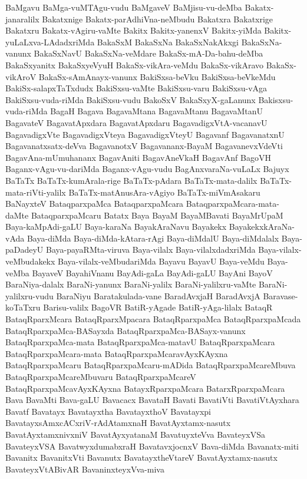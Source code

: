 {BaMgavu
BaMga-vuMTAgu-vudu
BaMgaveV
BaMjisu-vu-deMba
Bakatx-janaralilx
Bakatxnige
Bakatx-parAdhiVna-neMbudu
Bakatxra
Bakatxrige
Bakatxru
Bakatx-vAgiru-vaMte
Bakitx
Bakitx-yanenxV
Bakitx-yiMda
Bakitx-yuLaLxva-LAdadxriMda
BakaSxM
BakaSxNa
BakaSxNakAkxgi
BakaSxNa-vanunx
BakaSxNavU
BakaSxNa-veMdare
BakaSx-mA-Da-bahu-deMba
BakaSxyanitx
BakaSxyeVyuH
BakaSx-vikAra-veMdu
BakaSx-vikAravo
BakaSx-vikAroV
BakaSx-sAmAnayx-vanunx
BakiSxsa-beVku
BakiSxsa-beVkeMdu
BakiSx-salapxTaTxdudx
BakiSxsu-vaMte
BakiSxsu-varu
BakiSxsu-vAga
BakiSxsu-vuda-riMda
BakiSxsu-vudu
BakoSxV
BakaSxyX-gaLanunx
Bakisxsu-vuda-riMda
BagaH
Bagava
BagavaMtana
BagavaMtanu
BagavaMtanU
BagavateV
BagavatApxdara
BagavatApxdaru
BagavadigxVtA-vacanavU
BagavadigxVte
BagavadigxVteya
BagavadigxVteyU
Bagavanf
BagavanatxnU
Bagavanatxsatx-deVva
BagavanotxV
Bagavananx-BayaM
BagavanevxVdeVti
BagavAna-mUmuhananx
BagavAniti
BagavAneVkaH
BagavAnf
BagoVH
Baganx-vAgu-vu-dariMda
Baganx-vAgu-vudu
BagAnxvaraNa-vuLaLx
Bajuyx
BaTaTx
BaTaTx-kumArala-rige
BaTaTx-pAdara
BaTaTx-mata-dalilx
BaTaTx-mata-riVti-yalilx
BaTaTx-matAnusAra-vAgiyo
BaTaTx-miVmAsakaru
BaNayxteV
BataqparxpaMca
BataqparxpaMcara
BataqparxpaMcara-mata-daMte
BataqparxpaMcaru
Batatx
Baya
BayaM
BayaMBavati
BayaMrUpaM
Baya-kaMpAdi-gaLU
Baya-karaNa
BayakAraNavu
Bayakekx
BayakekxkAraNa-vAda
Baya-diMda
Baya-diMda-kAtara-rAgi
Baya-diMdalU
Baya-diMdalalx
Baya-paDadeyU
Baya-payaRMta-viruva
Baya-vilalx
Baya-vilalxdadxriMda
Baya-vilalx-veMbudakekx
Baya-vilalx-veMbudariMda
Bayavu
BayavU
Baya-veMdu
Baya-veMba
BayaveV
BayahiVnanu
BayAdi-gaLa
BayAdi-gaLU
BayAni
BayoV
BaraNiya-dalalx
BaraNi-yanunx
BaraNi-yalilx
BaraNi-yalilxru-vaMte
BaraNi-yalilxru-vudu
BaraNiyu
Baratakulada-vane
BaradAvxjaH
BaradAvxjA
Baravase-koTaTxru
Barisu-valilx
BagoVR
BatiR-yAgade
BatiR-yAga-lilalx
BataqR
BataqRparxMcara
BataqRparxMpacara
BataqRparxpaMca
BataqRparxpaMcada
BataqRparxpaMca-BASayxda
BataqRparxpaMca-BASayx-vanunx
BataqRparxpaMca-mata
BataqRparxpaMca-matavU
BataqRparxpaMcara
BataqRparxpaMcara-mata
BataqRparxpaMcaravAyxKAyxna
BataqRparxpaMcaru
BataqRparxpaMcaru-mADida
BataqRparxpaMcareMbuva
BataqRparxpaMcareMbuvaru
BataqRparxpaMcareV
BataqRparxpaMcavAyxKAyxna
BatayxRparxpaMcara
BatarxRparxpaMcara
Bava
BavaMti
Bava-gaLU
Bavacacx
BavataH
Bavati
BavatiVti
BavatiVtAyxhara
Bavatf
Bavatayx
Bavatayxtha
BavatayxthoV
Bavatayxpi
BavatayxsAmxcACxriV-rAdAtamxnaH
BavatAyxtamx-nasutx
BavatAyxtamxnivxniV
BavatAyxyatanaM
BavatuyxteVva
BavateyxVSa
BavateyxVSA
BavatwyxdumabxraH
BavatavxjocnxV
Bava-diMda
Bavanatx-miti
Bavanitx
BavanitxVti
Bavanutx
BavatayxtheVtareV
BavatAyxtamx-nasutx
BavateyxVtABivAR
BavaninxteyxVva-miva
}

